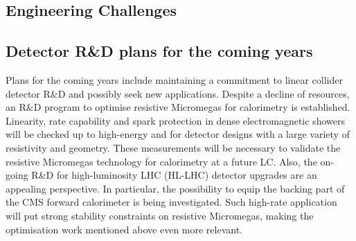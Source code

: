 \subsection{Engineering Challenges}

\subsection{Detector R\&D plans for the coming years}

Plans for the coming years include maintaining a commitment to linear collider detector R\&D and possibly seek new applications. Despite a decline of resources, an R\&D program to optimise resistive Micromegas for calorimetry is established. Linearity, rate capability and spark protection in dense electromagnetic showers will be checked up to high-energy and for detector designs with a large variety of resistivity and geometry. These measurements will be necessary to validate the resistive Micromegas technology for calorimetry at a future LC. Also, the on-going R\&D for high-luminosity LHC (HL-LHC) detector upgrades are an appealing perspective. In particular, the possibility to equip the backing part of the CMS forward calorimeter is being investigated. Such high-rate application will put strong stability constraints on resistive Micromegas, making the optimisation work mentioned above even more relevant.

